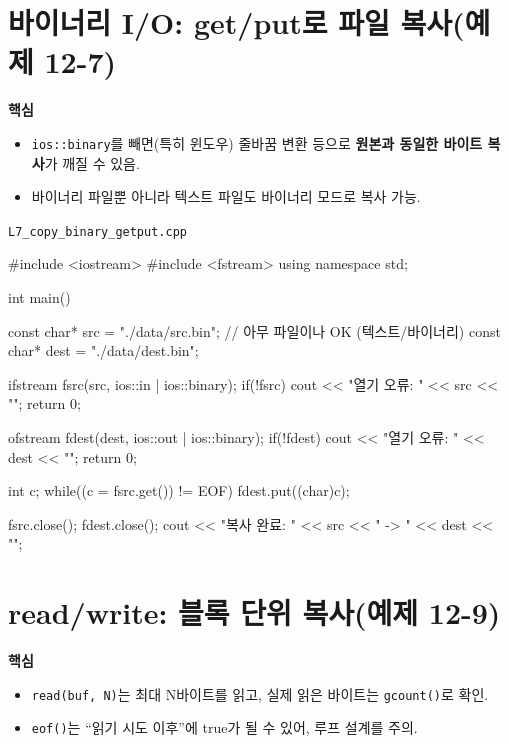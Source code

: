 \documentclass[11pt,a4paper]{article}
\newcommand{\filetag}[1]{\texttt{\color{Accent}#1}}
\begin{document}
\section{바이너리 I/O: get/put로 파일 복사(예제 12-7)}
\begin{GoalBox}
\textbf{핵심}
\begin{itemize}[leftmargin=18pt]
  \item \texttt{ios::binary}를 빼면(특히 윈도우) 줄바꿈 변환 등으로 \textbf{원본과 동일한 바이트 복사}가 깨질 수 있음. %
  \item 바이너리 파일뿐 아니라 텍스트 파일도 바이너리 모드로 복사 가능.
\end{itemize}
\end{GoalBox}

\noindent\filetag{L7\_copy\_binary\_getput.cpp}
\begin{cppcode}
#include <iostream>
#include <fstream>
using namespace std;

int main() {
    const char* src  = "./data/src.bin";   // 아무 파일이나 OK (텍스트/바이너리)
    const char* dest = "./data/dest.bin";

    ifstream fsrc(src, ios::in | ios::binary);
    if(!fsrc) { cout << "열기 오류: " << src << "\n"; return 0; }

    ofstream fdest(dest, ios::out | ios::binary);
    if(!fdest) { cout << "열기 오류: " << dest << "\n"; return 0; }

    int c;
    while((c = fsrc.get()) != EOF) {
        fdest.put((char)c);
    }

    fsrc.close();
    fdest.close();
    cout << "복사 완료: " << src << " -> " << dest << "\n";
}
\end{cppcode}

\section{read/write: 블록 단위 복사(예제 12-9)}
\begin{GoalBox}
\textbf{핵심}
\begin{itemize}[leftmargin=18pt]
  \item \texttt{read(buf, N)}는 최대 N바이트를 읽고, 실제 읽은 바이트는 \texttt{gcount()}로 확인. %
  \item \texttt{eof()}는 ``읽기 시도 이후''에 true가 될 수 있어, 루프 설계를 주의.
\end{itemize}
\end{GoalBox}
\end{document}
